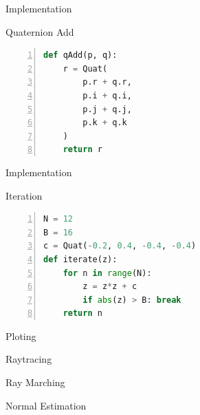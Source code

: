 \documentclass[aspectratio=169,t]{beamer}
\begin{document}
\begin{frame}[label={sec:orgc9cf3e2},fragile]{Implementation}
 \begin{block}{Quaternion Add}
\begin{lstlisting}[language=Python,firstnumber=1,numbers=left]
def qAdd(p, q):
    r = Quat(
        p.r + q.r,
        p.i + q.i,
        p.j + q.j,
        p.k + q.k
    )
    return r
\end{lstlisting}
\end{block}
\end{frame}

\begin{frame}[label={sec:org3cb6bbd},fragile]{Implementation}
 \begin{block}{Iteration}
\begin{lstlisting}[language=Python,firstnumber=1,numbers=left]
N = 12
B = 16
c = Quat(-0.2, 0.4, -0.4, -0.4)
def iterate(z):
    for n in range(N):
        z = z*z + c
        if abs(z) > B: break
    return n
\end{lstlisting}
\end{block}
\end{frame}

\begin{frame}[label={sec:org6b96eff}]{Ploting}
\end{frame}

\begin{frame}[label={sec:orga817103}]{Raytracing}
\end{frame}

\begin{frame}[label={sec:org8b95f81}]{Ray Marching}
\end{frame}

\begin{frame}[label={sec:orgb721ea0}]{Normal Estimation}
\end{frame}
\end{document}
